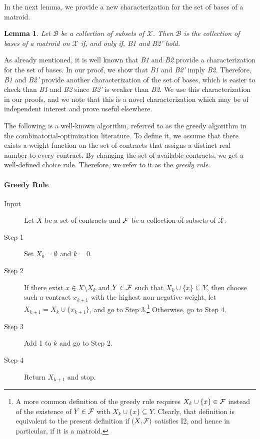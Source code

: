 \documentclass[12pt]{amsart}
\newtheorem{lemma}{Lemma}
\theoremstyle{remark}
\begin{document}
In the next lemma, we provide a new characterization for the set of bases of a matroid.

\begin{lemma}\label{lem:matchar}
Let $\mathcal{B}$ be a collection of subsets of $\mathcal{X}$. Then
$\mathcal{B}$ is the collection of bases of a matroid on $\mathcal{X}$
if, and only if, B1 and B2' hold.
\end{lemma}

As already mentioned, it is well known that \emph{B1} and \emph{B2} provide
a characterization for the set of bases. In our proof, we show that
\emph{B1} and \emph{B2'} imply \emph{B2}. Therefore, \emph{B1} and \emph{B2'}
provide another characterization of the set of bases, which is easier to
check than \emph{B1} and \emph{B2} since \emph{B2'} is weaker than \emph{B2}.
We use this characterization in our proofs, and we note that this is
a novel characterization which may be of independent interest and prove
useful elsewhere.

The following is a well-known algorithm, referred to as the greedy
algorithm in the combinatorial-optimization literature.
To define it, we assume that
there exists a weight function on the set of contracts that assigns a distinct real
number to every contract. By changing the set of available contracts,
we get a well-defined choice rule. Therefore, we refer to it as the \emph{greedy rule}.

\medskip
\paragraph{\textbf{Greedy Rule}}
\begin{description}
  \item[Input] Let $X$ be a set of contracts and $\mathcal{F}$ be a collection of subsets of $\mathcal{X}$.
  \item[Step 1] Set $X_0=\emptyset$ and $k=0$.
  \item[Step 2] If there exist $x \in X \setminus X_k$ and $Y\in \mathcal{F}$ such that $X_k \cup \{x\} \subseteq Y$,
        then choose such a contract $x_{k+1}$ with the highest non-negative weight,
        let $X_{k+1}=X_k \cup \{x_{k+1}\}$, and go to Step 3.\footnote{A more common definition of the greedy rule requires  $X_k \cup \{x\} \in \mathcal{F}$ instead of the existence of $Y \in \mathcal{F}$ with $X_k \cup \{x\} \subseteq Y$. Clearly, that definition is equivalent to the present definition if $(X, \mathcal{F})$ satisfies I2, and hence in particular, if it is a matroid.} Otherwise, go to Step 4.
  \item[Step 3] Add 1 to $k$ and go to Step 2.
  \item[Step 4] Return $X_{k+1}$ and stop.
\end{description}
\end{document}
